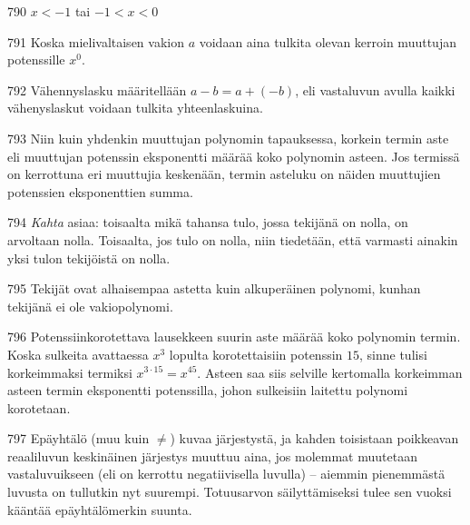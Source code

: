 \begin{Vastaus}{790}
        $x<-1$ tai $ -1<x<0$
    
\end{Vastaus}
\begin{Vastaus}{791}
	Koska mielivaltaisen vakion $a$ voidaan aina tulkita olevan kerroin muuttujan potenssille $x^0$.
	
\end{Vastaus}
\begin{Vastaus}{792}
	Vähennyslasku määritellään $a-b=a+(-b)$, eli vastaluvun avulla kaikki vähenyslaskut voidaan tulkita yhteenlaskuina.
	
\end{Vastaus}
\begin{Vastaus}{793}
	Niin kuin yhdenkin muuttujan polynomin tapauksessa, korkein termin aste eli muuttujan potenssin eksponentti määrää koko polynomin asteen. Jos termissä on kerrottuna eri muuttujia keskenään, termin asteluku on näiden muuttujien potenssien eksponenttien summa.
	
\end{Vastaus}
\begin{Vastaus}{794}
\textit{Kahta} asiaa: toisaalta mikä tahansa tulo, jossa tekijänä on nolla, on arvoltaan nolla. Toisaalta, jos tulo on nolla, niin tiedetään, että varmasti ainakin yksi tulon tekijöistä on nolla.
	
\end{Vastaus}
\begin{Vastaus}{795}
Tekijät ovat alhaisempaa astetta kuin alkuperäinen polynomi, kunhan tekijänä ei ole vakiopolynomi.
	
\end{Vastaus}
\begin{Vastaus}{796}
Potenssiinkorotettava lausekkeen suurin aste määrää koko polynomin termin. Koska sulkeita avattaessa $x^3$ lopulta korotettaisiin potenssin $15$, sinne tulisi korkeimmaksi termiksi $x^{3\cdot 15}=x^{45}$. Asteen saa siis selville kertomalla korkeimman asteen termin eksponentti potenssilla, johon sulkeisiin laitettu polynomi korotetaan.
	
\end{Vastaus}
\begin{Vastaus}{797}
Epäyhtälö (muu kuin $\neq$) kuvaa järjestystä, ja kahden toisistaan poikkeavan reaaliluvun keskinäinen järjestys muuttuu aina, jos molemmat muutetaan vastaluvuikseen (eli on kerrottu negatiivisella luvulla) -- aiemmin pienemmästä luvusta on tullutkin nyt suurempi. Totuusarvon säilyttämiseksi tulee sen vuoksi kääntää epäyhtälömerkin suunta.
	
\end{Vastaus}
